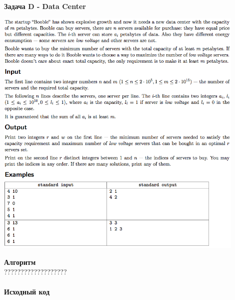 \documentclass[a4paper,12pt]{article}
\begin{document}
\textbf{{\large Задача D - Data Center}} \\
\begin{center}
\includegraphics[width=0.9\textwidth]{CT_ACM_WEST/CT_ACM_WEST_D.png}\\ [1cm]
\end{center}
\textbf{{\large Алгоритм}} \\
{\Huge ???????????????????} \\ 
\\
\newpage
\textbf{{\large Исходный код}}
\end{document}

